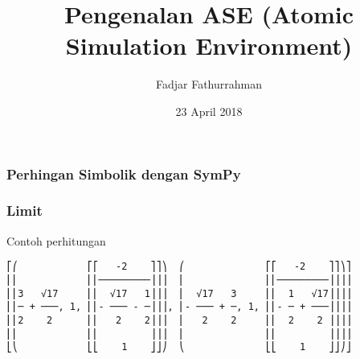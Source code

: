 \documentclass[bahasa,10pt]{beamer}
\begin{document}
\title{Pengenalan ASE (Atomic Simulation Environment)}
\author{Fadjar Fathurrahman}
\date{23 April 2018}

\frame{\titlepage}

\begin{frame}
\frametitle{Perhingan Simbolik dengan SymPy}


\end{frame}



\begin{frame}[fragile]
\frametitle{Limit}

Contoh perhitungan

\begin{verbatim}
⎡⎛            ⎡⎡   -2    ⎤⎤⎞  ⎛              ⎡⎡   -2    ⎤⎤⎞⎤
⎢⎜            ⎢⎢─────────⎥⎥⎟  ⎜              ⎢⎢─────────⎥⎥⎟⎥
⎢⎜3   √17     ⎢⎢  √17   1⎥⎥⎟  ⎜  √17   3     ⎢⎢  1   √17⎥⎥⎟⎥
⎢⎜─ + ───, 1, ⎢⎢- ─── - ─⎥⎥⎟, ⎜- ─── + ─, 1, ⎢⎢- ─ + ───⎥⎥⎟⎥
⎢⎜2    2      ⎢⎢   2    2⎥⎥⎟  ⎜   2    2     ⎢⎢  2    2 ⎥⎥⎟⎥
⎢⎜            ⎢⎢         ⎥⎥⎟  ⎜              ⎢⎢         ⎥⎥⎟⎥
⎣⎝            ⎣⎣    1    ⎦⎦⎠  ⎝              ⎣⎣    1    ⎦⎦⎠⎦
\end{verbatim}

\end{frame}
\end{document}
